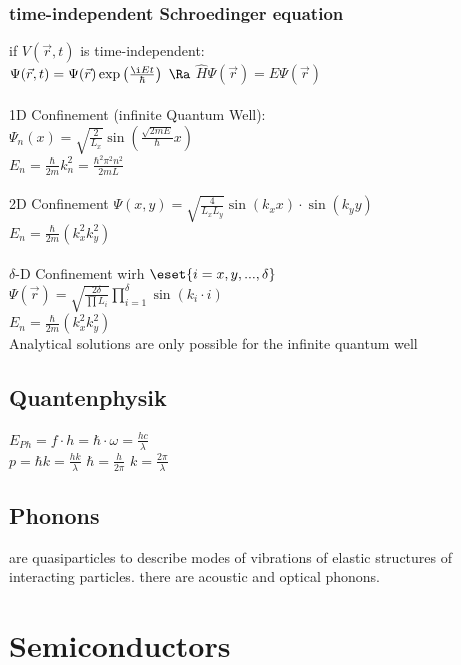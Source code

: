 \documentclass[fs, footer]{latex4ei}
\begin{document}
\begin{multicols}{4}
		\subsubsection{time-independent Schroedinger equation}
		if $V(\vec r,t)$ is time-independent:\\
		$\Psi(\vec r,t) = \Psi(\vec r) \exp\left(\frac{\i E t}{\hbar}\right)$ \quad $\Ra$ \quad $\hat H \Psi(\vec r) = E \Psi(\vec r)$\\
		\\
		1D Confinement (infinite Quantum Well):\\
		$\Psi_n(x) = \sqrt{\frac{2}{L_x}} \sin \left( \frac{\sqrt{2mE}}{\hbar} x \right)$\\
		$E_n = \frac{\hbar}{2m} k_n^2 = \frac{\hbar^2 \pi^2 n^2}{2mL}$\\
		\\
		2D Confinement
		$\Psi(x,y) = \sqrt{\frac{4}{L_x L_y}} \sin(k_x x) \cdot \sin(k_y y)$\\
		$E_n = \frac{\hbar}{2m} (k_x^2 k_y^2)$\\
		\\
		$\delta$-D Confinement wirh $\eset{i=x,y,...,\delta}$\\
		$\Psi(\vec r) = \sqrt{\frac{2\delta}{ \prod L_i }} \prod\limits_{i=1}^\delta \sin(k_i \cdot i)$\\
		$E_n = \frac{\hbar}{2m} (k_x^2 k_y^2)$\\
		
		Analytical solutions are only possible for the infinite quantum well

	\subsection{Quantenphysik}
	$E_{Ph}=f\cdot h= \hbar \cdot \omega = \frac{hc}{\lambda}$ \qquad {}\\
	$p = \hbar k = \frac{hk}{\lambda}$ \qquad $\hbar = \frac{h}{2\pi}$ \qquad $k=\frac{2\pi}{\lambda}$\\



	\subsection{Phonons}
	are quasiparticles to describe modes of vibrations of elastic structures of interacting particles.
	there are acoustic and optical phonons.



	\section{Semiconductors}
	

\end{multicols}
\end{document}

